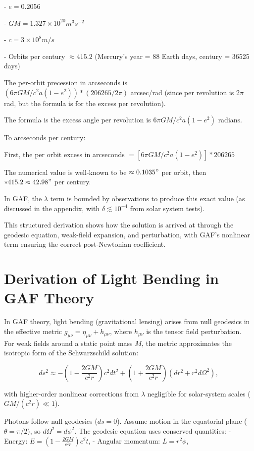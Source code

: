 \documentclass{article}
\begin{document}
- \(e = 0.2056\)

- \(GM = 1.327 \times 10^{20} m^3 s^{-2}\)

- \(c = 3 \times 10^8 m/s\)

- Orbits per century \(\approx 415.2\) (Mercury's year = 88 Earth days, century = 36525 days)

The per-orbit precession in arcseconds is \((6 \pi GM / c^2 a (1 - e^2)) * (206265 / 2\pi)\) arcsec/rad (since per revolution is \(2\pi\) rad, but the formula is for the excess per revolution).

The formula is the excess angle per revolution is \(6 \pi GM / c^2 a (1 - e^2)\) radians.

To arcseconds per century:

First, the per orbit excess in arcseconds \(= [6 \pi GM / c^2 a (1 - e^2)] * 206265\)

The numerical value is well-known to be \(\approx 0.1035 "\) per orbit, then \(* 415.2 \approx 42.98 "\) per century.

In GAF, the \(\lambda\) term is bounded by observations to produce this exact value (as discussed in the appendix, with \(\delta \lesssim 10^{-4}\) from solar system tests).

This structured derivation shows how the solution is arrived at through the geodesic equation, weak-field expansion, and perturbation, with GAF's nonlinear term ensuring the correct post-Newtonian coefficient.

\section{Derivation of Light Bending in GAF Theory}

In GAF theory, light bending (gravitational lensing) arises from null geodesics in the effective metric \( g_{\mu\nu} = \eta_{\mu\nu} + h_{\mu\nu} \), where \( h_{\mu\nu} \) is the tensor field perturbation. For weak fields around a static point mass \( M \), the metric approximates the isotropic form of the Schwarzschild solution:

\[
ds^2 \approx -\left(1 - \frac{2GM}{c^2 r}\right) c^2 dt^2 + \left(1 + \frac{2GM}{c^2 r}\right) (dr^2 + r^2 d\Omega^2),
\]

with higher-order nonlinear corrections from \( \lambda \) negligible for solar-system scales (\( GM/(c^2 r) \ll 1 \)).

Photons follow null geodesics (\( ds = 0 \)). Assume motion in the equatorial plane (\( \theta = \pi/2 \)), so \( d\Omega^2 = d\phi^2 \). The geodesic equation uses conserved quantities:
- Energy: \( E = \left(1 - \frac{2GM}{c^2 r}\right) c^2 \dot{t} \),
- Angular momentum: \( L = r^2 \dot{\phi} \),
\end{document}
